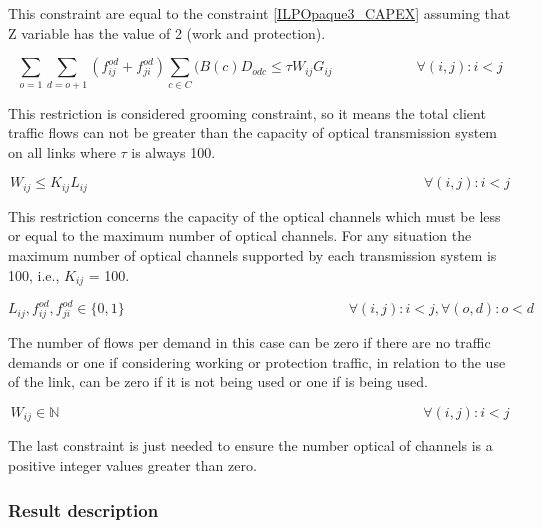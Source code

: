 This constraint are equal to the constraint \ref{ILPOpaque3_CAPEX} assuming that Z variable has the value of 2 (work and protection).

\begin{equation}
\sum_{o=1} \sum_{d=o+1} \left(f_{ij}^{od} + f_{ji}^{od}\right) \sum_{c\in C} (B\left(c\right) D_{odc}\leq \tau W_{ij} G_{ij} \qquad \qquad \qquad
\forall(i,j) : i < j
\label{ILPOpaque4}
\end{equation}

This restriction is considered grooming constraint, so it means the total client traffic flows can not be greater than the capacity of optical transmission system on all links where $\tau$ is always 100.

\begin{equation}
W_{ij} \leq K_{ij} L_{ij} \qquad \qquad \qquad \qquad \qquad \qquad \qquad \qquad \qquad \qquad \qquad \qquad \forall(i,j) : i < j
\label{ILPOpaque5}
\end{equation}

This restriction concerns the capacity of the optical channels which must be less or equal to the maximum number of optical channels. For any situation the maximum number of optical channels supported by each transmission system is 100, i.e., $K_{ij}$ = 100.

\begin{equation}
L_{ij} , f_{ij}^{od} , f_{ji}^{od} \in \{0,1\}   \qquad \qquad \qquad \qquad \qquad \qquad \qquad \qquad
\forall(i,j) : i < j, \forall(o,d) : o < d
\label{ILPOpaque6}
\end{equation}

The number of flows per demand in this case can be zero if there are no traffic demands or one if considering working or protection traffic, in relation to the use of the link, can be zero if it is not being used or one if is being used.

\begin{equation}
W_{ij} \in \mathbb{N}  \qquad \qquad \qquad \qquad \qquad \qquad \qquad \qquad \qquad \qquad \qquad \qquad \qquad
\forall(i,j) : i < j\label{ILPOpaque7}
\end{equation}

The last constraint is just needed to ensure the number optical of channels is a positive integer values greater than zero.\\


\subsubsection{Result description}

